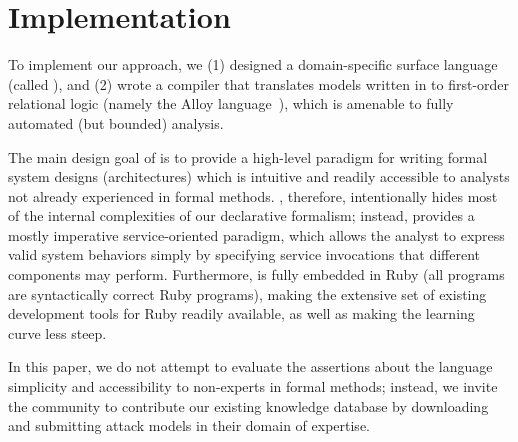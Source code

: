 
\section{Implementation}
\label{sec-implementation}

To implement our approach, we (1) designed a domain-specific surface
language (called \sLangLong), and (2) wrote a compiler that translates
models written in \sLang to first-order relational logic (namely the
Alloy language~\cite{alloy}), which is amenable to fully automated
(but bounded) analysis.

The main design goal of \sLang is to provide a high-level paradigm for
writing formal system designs (architectures) which is intuitive and
readily accessible to analysts not already experienced in formal
methods.  \sLang, therefore, intentionally hides most of the internal
complexities of our declarative formalism; instead, \sLang provides a
mostly imperative service-oriented paradigm, which allows the analyst
to express valid system behaviors simply by specifying service
invocations that different components may perform.  Furthermore,
\sLang is fully embedded in Ruby (all \sLang programs are
syntactically correct Ruby programs), making the extensive set of
existing development tools for Ruby readily available, as well as
making the learning curve less steep.

In this paper, we do not attempt to evaluate the assertions about the
language simplicity and accessibility to non-experts in formal
methods; instead, we invite the community to contribute our existing
knowledge database by downloading \sLang~\cite{slang-web} and
submitting attack models in their domain of expertise.\check{!}


